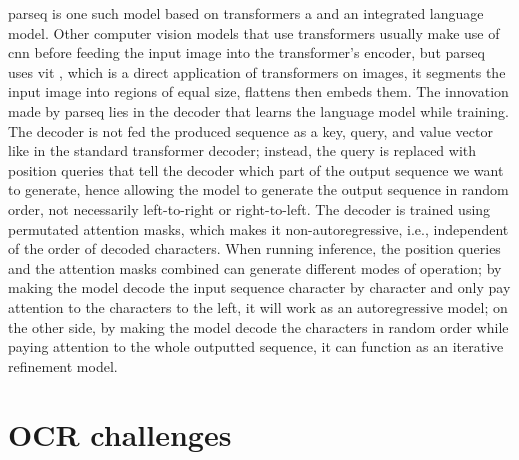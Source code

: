 \label{parseq}\gls{parseq} \cite{bautista_scene_2022} is one such model based on transformers a and an integrated language model. Other computer vision models that use transformers usually make use of \gls{cnn} before feeding the input image into the transformer's encoder, but \gls{parseq} uses \gls{vit} \cite{dosovitskiy_image_2021}, which is a direct application of transformers on images, it segments the input image into regions of equal size, flattens then embeds them. The innovation made by \gls{parseq} lies in the decoder that learns the language model while training. The decoder is not fed the produced sequence as a key, query, and value vector like in the standard transformer decoder; instead, the query is replaced with position queries that tell the decoder which part of the output sequence we want to generate, hence allowing the model to generate the output sequence in random order, not necessarily left-to-right or right-to-left. The decoder is trained using permutated attention masks, which makes it non-autoregressive, i.e., independent of the order of decoded characters. When running inference, the position queries and the attention masks combined can generate different modes of operation; by making the model decode the input sequence character by character and only pay attention to the characters to the left, it will work as an autoregressive model; on the other side, by making the model decode the characters in random order while paying attention to the whole outputted sequence, it can function as an iterative refinement model.

\section{OCR challenges} \label{ch:foundations:ocr_challenges}

